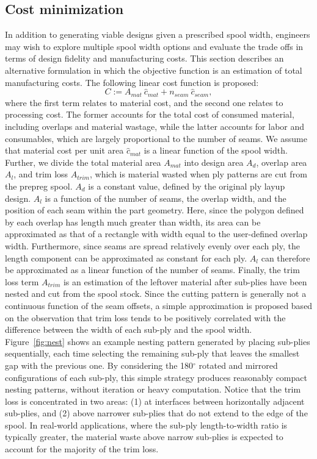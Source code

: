 \subsection{Cost minimization}
In addition to generating viable designs given a prescribed spool width, engineers may wish to explore multiple spool width options and evaluate the trade offs in terms of design fidelity and manufacturing costs. This section describes an alternative formulation in which the objective function is an estimation of total manufacturing costs. The following linear cost function is proposed:
\begin{equation}
    \label{eq:cost}
    C :=  A_{mat} \ \hat{c}_{mat} + n_{seam} \ \hat{c}_{seam},
\end{equation}
where the first term relates to material cost, and the second one relates to processing cost. The former accounts for the total cost of consumed material, including overlaps and material wastage, while the latter accounts for labor and consumables, which are largely proportional to the number of seams. 
We assume that material cost per unit area $\hat{c}_{mat}$ is a linear function of the spool width. Further, we divide the total material area $A_{mat}$ into design area $A_d$, overlap area $A_l$, and trim loss $A_{trim}$, which is material wasted when ply patterns are cut from the prepreg spool.
$A_d$ is a constant value, defined by the original ply layup design. $A_l$ is a function of the number of seams, the overlap width, and the position of each seam within the part geometry. Here, since the polygon defined by each overlap has length much greater than width, its area can be approximated as that of a rectangle with width equal to the user-defined overlap width. Furthermore, since seams are spread relatively evenly over each ply, the length component can be approximated as constant for each ply. $A_l$ can therefore be approximated as a linear function of the number of seams. Finally, the trim loss term $A_{trim}$ is an estimation of the leftover material after sub-plies have been nested and cut from the spool stock. Since the cutting pattern is generally not a continuous function of the seam offsets, a simple approximation is proposed based on the observation that trim loss tends to be positively correlated with the difference between the width of each sub-ply and the spool width. Figure~\ref{fig:nest} shows an example nesting pattern generated by placing sub-plies sequentially, each time selecting the remaining sub-ply that leaves the smallest gap with the previous one. By considering the 180$^{\circ}$ rotated and mirrored configurations of each sub-ply, this simple strategy produces reasonably compact nesting patterns, without iteration or heavy computation. Notice that the trim loss is concentrated in two areas: (1) at interfaces between horizontally adjacent sub-plies, and (2) above narrower sub-plies that do not extend to the edge of the spool. In real-world applications, where the sub-ply length-to-width ratio is typically greater, the material waste above narrow sub-plies is expected to account for the majority of the trim loss.

